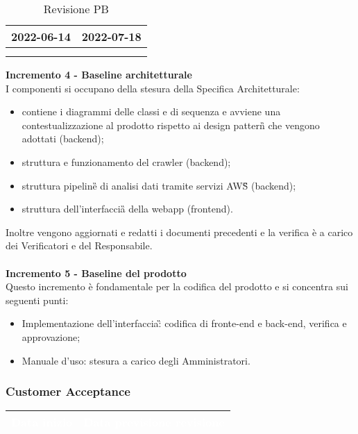 {{{\begin{longtable}{C{.4\freewidth} C{.4\freewidth}}
        2022-06-14 & 2022-07-18 \\
        \bottomrule
        \\
        \caption{Revisione PB}
        \end{longtable}
    \textbf{Incremento 4 - Baseline architetturale} \\
    I componenti si occupano della stesura della Specifica Architetturale: 
    \begin{itemize}
        \item contiene i diagrammi delle classi e di sequenza e avviene una contestualizzazione al prodotto rispetto ai design pattern\G{} che vengono adottati (backend);
        \item struttura e funzionamento del crawler (backend);
        \item struttura pipeline\G{} di analisi dati tramite servizi AWS\G{} (backend);
        \item struttura dell'interfaccia\G{} della webapp (frontend).
    \end{itemize}
    Inoltre vengono aggiornati e redatti i documenti precedenti e la verifica è a carico dei Verificatori e del Responsabile.\\ \\
    \textbf{Incremento 5 - Baseline del prodotto} \\
    Questo incremento è fondamentale per la codifica del prodotto e si concentra sui seguenti punti:
    \begin{itemize}
        \item Implementazione dell'interfaccia\G: codifica di fronte-end e back-end, verifica e approvazione;
        \item Manuale d'uso: stesura a carico degli Amministratori.
    \end{itemize}
    }
\newpage
    \subsubsection{Customer Acceptance} {
        \setlength{\freewidth}{\dimexpr\textwidth-30\tabcolsep}
        \renewcommand{\arraystretch}{1.0}
        \setlength{\aboverulesep}{0pt}
        \setlength{\belowrulesep}{0pt}
        \begin{longtable}{C{.4\freewidth} C{.4\freewidth}}
        \toprule
        \textcolor{white}{\textbf{Data inizio}}&
        \textcolor{white}{\textbf{Data previsione revisione}} \\
        \toprule
        \endhead
            

\end{longtable}}}}
